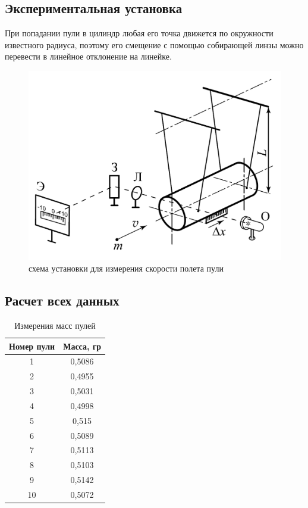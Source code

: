 \documentclass[a4paper]{article}
\begin{document}
\subsection{Экспериментальная установка}
При попадании пули в цилиндр любая его точка движется по окружности известного радиуса, поэтому его смещение с помощью собирающей линзы можно перевести в линейное отклонение на линейке.\\
	\begin{figure}[!h]
		\begin{center}
			\includegraphics[scale = 0.8]{ustan1}
			\caption{схема установки для измерения скорости полета пули}
		\end{center}
	\end{figure}
\newpage
\subsection{Расчет всех данных}


\begin{table}[h!]
\begin{center}
\begin{tabular}{|c|c|}
\hline
Номер пули & Масса, гр \\ \hline
1          & 0,5086    \\ \hline
2          & 0,4955    \\ \hline
3          & 0,5031    \\ \hline
4          & 0,4998    \\ \hline
5          & 0,515     \\ \hline
6          & 0,5089    \\ \hline
7          & 0,5113    \\ \hline
8          & 0,5103    \\ \hline
9          & 0,5142    \\ \hline
10         & 0,5072    \\ \hline
\end{tabular}
\caption{Измерения масс пулей}
\end{center}
\end{table}
\end{document}
